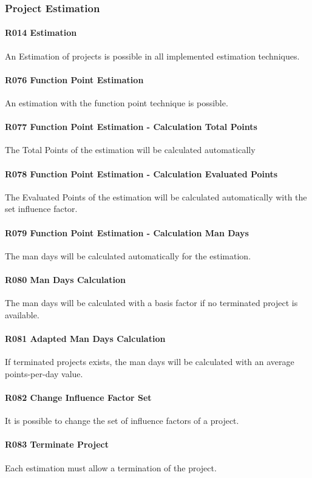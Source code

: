\subsubsection{Project Estimation}
\paragraph{R014 Estimation}
An Estimation of projects is possible in all implemented estimation techniques.
\paragraph{R076 Function Point Estimation}
An estimation with the function point technique is possible.
\paragraph{R077 Function Point Estimation - Calculation Total Points}
The Total Points of the estimation will be calculated automatically
\paragraph{R078 Function Point Estimation - Calculation Evaluated Points}
The Evaluated Points of the estimation will be calculated automatically with the set influence factor.
\paragraph{R079 Function Point Estimation - Calculation Man Days}
The man days will be calculated automatically for the estimation.
\paragraph{R080 Man Days Calculation}
The man days will be calculated with a basis factor if no terminated project is available.
\paragraph{R081 Adapted Man Days Calculation}
If terminated projects exists, the man days will be calculated with an average points-per-day value.
\paragraph{R082 Change Influence Factor Set}
It is possible to change the set of influence factors of a project.
\paragraph{R083 Terminate Project}
Each estimation must allow a termination of the project.
